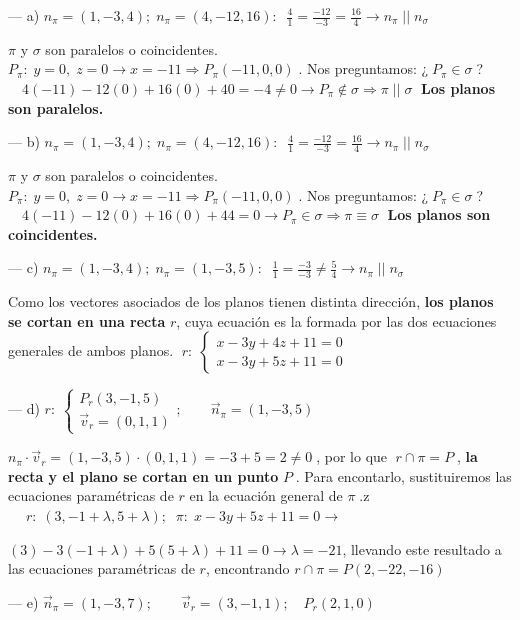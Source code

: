 \begin{proofw}\renewcommand{\qedsymbol}{$\diamond$}
			--- a) $n_{\pi}= (1,-3,4);\; n_{\pi}=(4,-12,16):\;\; \frac{4}{1}=\frac{-12}{-3}=\frac{16}{4} \to n_{\pi}\;||\;n_{\sigma}$
	
	\noindent $\pi$ y $\sigma$ son paralelos o coincidentes. $P_{\pi}:\; y=0,\; z=0 \to x=-11 \Rightarrow P_{\pi}(-11,0,0)\;$. Nos preguntamos: ¿$\;P_{\pi} \in \sigma\;$? $\quad 4(-11)-12(0)+16(0)+40=-4\neq 0 \to P_{\pi} \notin \sigma \Rightarrow \pi\;||\;\sigma\;$ \textbf{Los planos son paralelos.}
	
	\noindent --- b) $n_{\pi}= (1,-3,4);\; n_{\pi}=(4,-12,16):\;\; \frac{4}{1}=\frac{-12}{-3}=\frac{16}{4} \to n_{\pi}\;||\;n_{\sigma}$
	
	\noindent $\pi$ y $\sigma$ son paralelos o coincidentes. $P_{\pi}:\; y=0,\; z=0 \to x=-11 \Rightarrow P_{\pi}(-11,0,0)\;$. Nos preguntamos: ¿$\;P_{\pi} \in \sigma\;$? $\quad 4(-11)-12(0)+16(0)+44= 0 \to P_{\pi} \in \sigma \Rightarrow \pi\equiv\sigma\;$ \textbf{Los planos son coincidentes.}
	
	\noindent --- c) $n_{\pi}= (1,-3,4);\; n_{\pi}=(1,-3,5):\;\; \frac{1}{1}=\frac{-3}{-3} \neq \frac{5}{4} \to n_{\pi}\;||\;n_{\sigma}$
	
	\noindent Como los vectores asociados de los planos tienen distinta dirección, \textbf{los planos se cortan en una recta} $r$, cuya ecuación es la formada por las dos ecuaciones generales de ambos planos. $\;r:\; \begin{cases}  x-3y+4z+11=0  \\x-3y+5z+11=0 \end{cases}$
	
	\noindent --- d) $r:\; \begin{cases} P_r(3,-1,5) \\ \vec v_r=(0,1,1) \end{cases}; \qquad \vec n_{\pi}=(1,-3,5)$
	
	\noindent $n_{\pi} \cdot \vec v_r=(1,-3,5)\cdot (0,1,1)=-3+5=2\neq 0\;$, por lo que $\;r\cap \pi=P\;$, \textbf{la recta y el plano se cortan en un punto} $P\;$. Para encontarlo, sustituiremos las ecuaciones paramétricas de $r$ en la ecuación general de $\pi\;$.z $\quad\;r:\; (3,-1+\lambda,5+\lambda); \; \; \pi:\; x-3y+5z+11=0 \to $	
	
	\noindent $(3)-3(-1+\lambda)+5(5+\lambda)+11=0 \to \lambda=-21$, llevando este resultado a las ecuaciones paramétricas de $r$, encontrando $r\cap \pi = P(2, -22, -16)$
	
	\noindent --- e) $\vec n_{\pi}=(1,-3,7);\quad  \quad \vec v_r=(3,-1,1); \quad P_r(2,1,0)$
	

\end{proofw}
